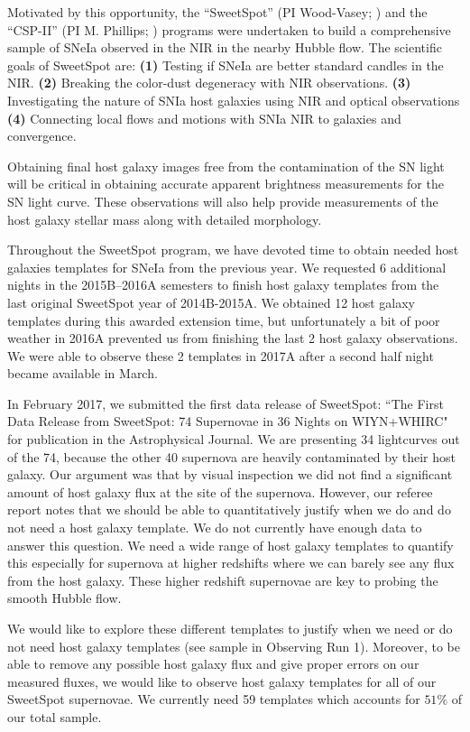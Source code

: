 \documentclass[11pt]{article}
\begin{document}
Motivated by this opportunity, the ``SweetSpot'' (PI Wood-Vasey; \cite{weyant14}) and the ``CSP-II'' (PI M. Phillips; \cite{contreras10,stritzinger11}) programs were undertaken to build a comprehensive sample of SNeIa observed in the NIR in the nearby Hubble flow.
The scientific goals of SweetSpot are:
{\bf (1)}
Testing if SNeIa are better standard candles in the NIR.
{\bf (2)}
Breaking the color-dust degeneracy with NIR observations.
{\bf (3)}
Investigating the nature of SNIa host galaxies using NIR and optical observations
{\bf (4)}
Connecting local flows and motions with SNIa NIR to galaxies and convergence.

Obtaining final host galaxy images free from the contamination of the SN light will be critical in obtaining accurate apparent brightness measurements for the SN light curve.  These observations will also help provide measurements of the host galaxy stellar mass along with detailed morphology.

Throughout the SweetSpot program, we have devoted time to obtain needed host galaxies templates for SNeIa from the previous year.  
We requested 6 additional nights in the 2015B--2016A semesters to finish host galaxy templates from the last original SweetSpot year of 2014B-2015A.  
We obtained 12 host galaxy templates during this awarded extension time, but unfortunately a bit of poor weather in 2016A prevented us from finishing the last 2 host galaxy observations.
We were able to observe these 2 templates in 2017A after a second half night became available in March.

In February 2017, we submitted the first data release of SweetSpot: ``The First Data Release from SweetSpot: 74 Supernovae in 36 Nights on WIYN+WHIRC"\cite{weyant17} for publication in the Astrophysical Journal. 
We are presenting 34 lightcurves out of the 74, because the other 40 supernova are heavily contaminated by their host galaxy. 
Our argument was that by visual inspection we did not find a significant amount of host galaxy flux at the site of the supernova.
However, our referee report notes that we should be able to quantitatively justify when we do and do not need a host galaxy template. 
We do not currently have enough data to answer this question. 
We need a wide range of host galaxy templates to quantify this especially for supernova at higher redshifts where we can barely see any flux from the host galaxy.
These higher redshift supernovae are key to probing the smooth Hubble flow.

We would like to explore these different templates to justify when we need or do not need host galaxy templates (see sample in Observing Run 1).
Moreover, to be able to remove any possible host galaxy flux and give proper errors on our measured fluxes, we would like to observe host galaxy templates for all of our SweetSpot supernovae.
We currently need 59 templates which accounts for $51\%$ of our total sample. 
\end{document}
